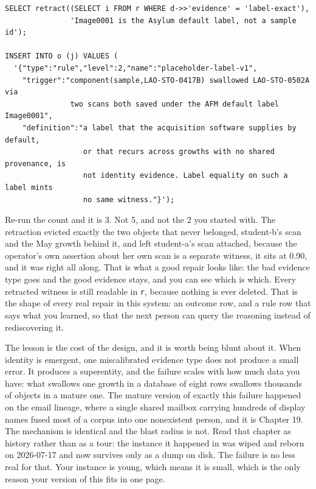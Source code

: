 \begin{lstlisting}
SELECT retract((SELECT i FROM r WHERE d->>'evidence' = 'label-exact'),
               'Image0001 is the Asylum default label, not a sample id');

INSERT INTO o (j) VALUES (
  '{"type":"rule","level":2,"name":"placeholder-label-v1",
    "trigger":"component(sample,LAO-STO-0417B) swallowed LAO-STO-0502A via
               two scans both saved under the AFM default label Image0001",
    "definition":"a label that the acquisition software supplies by default,
                  or that recurs across growths with no shared provenance, is
                  not identity evidence. Label equality on such a label mints
                  no same witness."}');
\end{lstlisting}

Re-run the count and it is 3. Not 5, and not the 2 you started with. The retraction evicted exactly the two objects that never belonged, student-b's scan and the May growth behind it, and left student-a's scan attached, because the operator's own assertion about her own scan is a separate witness, it sits at 0.90, and it was right all along. That is what a good repair looks like: the bad evidence type goes and the good evidence stays, and you can see which is which. Every retracted witness is still readable in \texttt{r}, because nothing is ever deleted. That is the shape of every real repair in this system: an outcome row, and a rule row that says what you learned, so that the next person can query the reasoning instead of rediscovering it.

The lesson is the cost of the design, and it is worth being blunt about it. When identity is emergent, one miscalibrated evidence type does not produce a small error. It produces a superentity, and the failure scales with how much data you have: what swallows one growth in a database of eight rows swallows thousands of objects in a mature one. The mature version of exactly this failure happened on the email lineage, where a single shared mailbox carrying hundreds of display names fused most of a corpus into one nonexistent person, and it is Chapter 19. The mechanism is identical and the blast radius is not. Read that chapter as history rather than as a tour: the instance it happened in was wiped and reborn on 2026-07-17 and now survives only as a dump on disk. The failure is no less real for that. Your instance is young, which means it is small, which is the only reason your version of this fits in one page.

